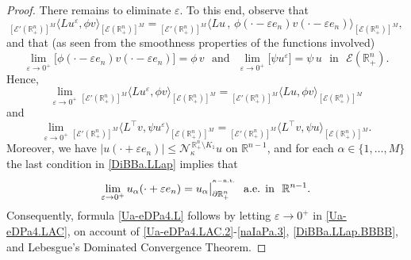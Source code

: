 \documentclass[11pt,reqno]{amsart}
\numberwithin{equation}{section}
\theoremstyle{remark}
\begin{document}
\begin{proof}
There remains to eliminate $\varepsilon$. To this end, observe that 
%
\begin{equation}\label{Ua-eDPa4.LAC.2}
{}_{[{\mathcal{E}}'(\mathbb{R}^{n}_{+})]^M}\big\langle Lu^\varepsilon,\phi v
\big\rangle_{[{\mathcal{E}}(\mathbb{R}^{n}_{+})]^M}
={}_{[{\mathcal{E}}'(\mathbb{R}^{n}_{+})]^M}\big\langle 
Lu\,,\,\phi(\cdot-\varepsilon e_n)v(\cdot-\varepsilon e_n)
\big\rangle_{[{\mathcal{E}}(\mathbb{R}^{n}_{+})]^M},
\end{equation}
%
and that (as seen from the smoothness properties of the functions involved)
%
\begin{equation}\label{naIaPa.2}
\lim\limits_{\varepsilon\to 0^{+}}
\big[\phi(\cdot-\varepsilon e_n)v(\cdot-\varepsilon e_n)\big]=\phi\,v
\,\,\text{ and }\,\,\lim\limits_{\varepsilon\to 0^{+}}\big[\psi u^\varepsilon\big]
=\psi\,u\,\,\text{ in }\,\,{\mathcal{E}}(\mathbb{R}^{n}_{+}).
\end{equation}
%
Hence, 
%
\begin{equation}\label{naIaPa.2.iiia}
\lim\limits_{\varepsilon\to 0^{+}}
{}_{[{\mathcal{E}}'(\mathbb{R}^{n}_{+})]^M}\big\langle Lu^\varepsilon,\phi v
\big\rangle_{[{\mathcal{E}}(\mathbb{R}^{n}_{+})]^M}
={}_{[{\mathcal{E}}'(\mathbb{R}^{n}_{+})]^M}\big\langle Lu,\phi v
\big\rangle_{[{\mathcal{E}}(\mathbb{R}^{n}_{+})]^M}
\end{equation}
%
and
%
\begin{equation}\label{naIaPa.2.iiib}
\lim\limits_{\varepsilon\to 0^{+}}
{}_{[{\mathcal{E}}'(\mathbb{R}^{n}_{+})]^M}\big\langle L^{\top}v,
\psi u^\varepsilon\big\rangle_{[{\mathcal{E}}(\mathbb{R}^{n}_{+})]^M}
={}_{[{\mathcal{E}}'(\mathbb{R}^{n}_{+})]^M}\big\langle L^{\top}v,
\psi u\big\rangle_{[{\mathcal{E}}(\mathbb{R}^{n}_{+})]^M}.
\end{equation}
%
Moreover, we have $|u(\cdot+\varepsilon e_n)|\leq{\mathcal{N}}^{\,\mathbb{R}^{n}_{+}\setminus K_1}_\kappa u$ 
on $\mathbb{R}^{n-1}$, and for each $\alpha\in\{1,\dots,M\}$ the last condition in \eqref{DiBBa.LLap} implies that 
%
\begin{equation}\label{naIaPa.3}
\lim\limits_{\varepsilon\to 0^{+}}u_\alpha(\cdot+\varepsilon e_n)
=u_\alpha\big|_{\partial\mathbb{R}^{n}_{+}}^{{}^{\kappa-{\rm n.t.}}}
\,\,\text{ a.e. in }\,\,\mathbb{R}^{n-1}.
\end{equation}
%
Consequently, formula \eqref{Ua-eDPa4.L} follows by letting $\varepsilon\to 0^{+}$
in \eqref{Ua-eDPa4.LAC}, on account of \eqref{Ua-eDPa4.LAC.2}-\eqref{naIaPa.3}, 
\eqref{DiBBa.LLap.BBBB}, and Lebesgue's Dominated Convergence Theorem.
\end{proof}
\end{document}
